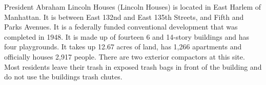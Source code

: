 President Abraham Lincoln Houses (Lincoln Houses) is located in East Harlem of Manhattan. It is between East 132nd and East 135th Streets, and Fifth and Parks Avenues. It is a federally funded conventional development that was completed in 1948. It is made up of fourteen 6 and 14-story buildings and has four playgrounds. It takes up 12.67 acres of land,  has 1,266 apartments and officially houses 2,917 people. There are two exterior compactors at this site. Most residents leave their trash in exposed trash bags in front of the building and do not use the buildings trash chutes.